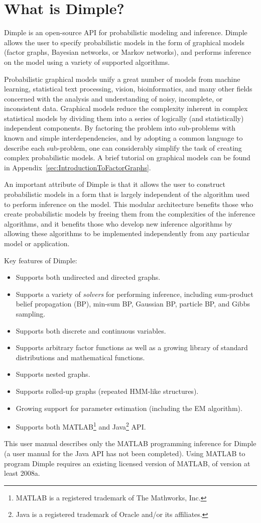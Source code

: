 \section{What is Dimple?}

Dimple is an open-source API for probabilistic modeling and inference. Dimple allows the user to specify probabilistic models in the form of graphical models (factor graphs, Bayesian networks, or Markov networks), and performs inference on the model using a variety of supported algorithms.

Probabilistic graphical models unify a great number of models from machine learning, statistical text processing, vision, bioinformatics, and many other fields concerned with the analysis and understanding of noisy, incomplete, or inconsistent data. Graphical models reduce the complexity inherent in complex statistical models by dividing them into a series of logically (and statistically) independent components. By factoring the problem into sub-problems with known and simple interdependencies, and by adopting a common language to describe each sub-problem, one can considerably simplify the task of creating complex probabilistic models.  A brief tutorial on graphical models can be found in Appendix~\ref{sec:IntroductionToFactorGraphs}.

An important attribute of Dimple is that it allows the user to construct probabilistic models in a form that is largely independent of the algorithm used to perform inference on the model. This modular architecture benefits those who create probabilistic models by freeing them from the complexities of the inference algorithms, and it benefits those who develop new inference algorithms by allowing these algorithms to be implemented independently from any particular model or application.

Key features of Dimple:
\begin{itemize}
\item Supports both undirected and directed graphs.
\item Supports a variety of \emph{solvers} for performing inference, including sum-product belief propagation (BP), min-sum BP, Gaussian BP, particle BP, and Gibbs sampling.
\item Supports both discrete and continuous variables.
\item Supports arbitrary factor functions as well as a growing library of standard distributions and mathematical functions.
\item Supports nested graphs.
\item Supports rolled-up graphs (repeated HMM-like structures).
\item Growing support for parameter estimation (including the EM algorithm).
\item Supports both MATLAB\footnote{MATLAB is a registered trademark of The Mathworks, Inc.} and Java\footnote{Java is a registered trademark of Oracle and/or its affiliates.} API.
\end{itemize}

This user manual describes only the MATLAB programming inference for Dimple (a user manual for the Java API has not been completed).  Using MATLAB to program Dimple requires an existing licensed version of MATLAB, of version at least 2008a.